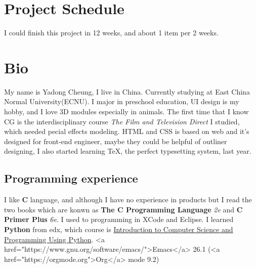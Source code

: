 \documentclass[11pt]{article}
\begin{document}
\section*{Project Schedule}
\label{sec:org459aebe}
I could finish this project in 12 weeks, and about 1 item per 2 weeks.

\section*{Bio}
\label{sec:org5f2548f}
  My name is Yadong Cheung, I live in China.
Currently studying at East China Normal University(ECNU).
I major in preschool education, UI design is my hobby, and I love 3D modules especially in animals.
The first time that I know CG is the interdisciplinary course \emph{The Film and Television Direct} 
I studied, which needed pecial effects modeling. HTML and CSS is based on web and it's designed for
front-end engineer, maybe they could be helpful of outliner designing, I also started learning \TeX, the perfect
typesetting system, last year. 

\subsection*{Programming experience}
\label{sec:org0ea0b54}
I like \textbf{C} language, and although I have no experience in products but I read the two books which are konwn as
 \textbf{The C Programming Language} \emph{2e} and
\textbf{C Primer Plus} \emph{6e}. I used to programming in XCode and Eclipse.
I learned \textbf{Python} from edx, which course is
 \href{https://www.edx.org/course/introduction-to-computer-science-and-programming-using-python-0}{Introduction to Computer Science and Programming Using Python}.
<a href="https://www.gnu.org/software/emacs/">Emacs</a> 26.1 (<a href="https://orgmode.org">Org</a> mode 9.2)
\end{document}
